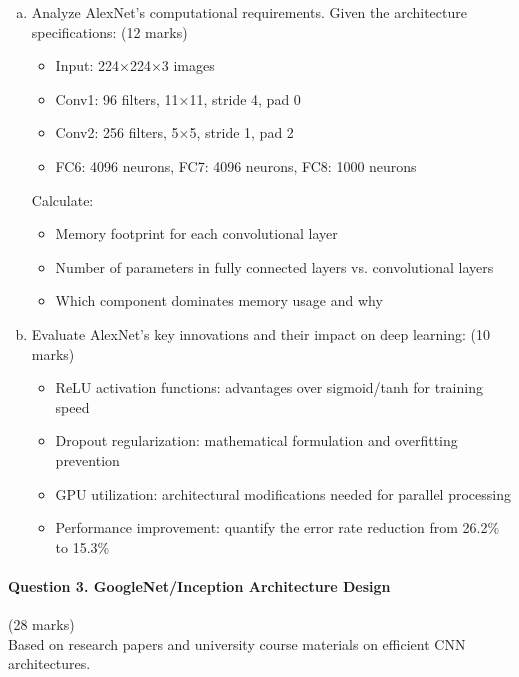 \documentclass[12pt]{article}
\newcommand{\mediumanswer}{\vspace{3cm}}
\newcommand{\journalspace}{\vspace{4.5cm}}
\begin{document}
\begin{enumerate}[(a)]
    \item Analyze AlexNet's computational requirements. Given the architecture specifications: \hfill (12 marks)
    \begin{itemize}
        \item Input: 224×224×3 images
        \item Conv1: 96 filters, 11×11, stride 4, pad 0
        \item Conv2: 256 filters, 5×5, stride 1, pad 2
        \item FC6: 4096 neurons, FC7: 4096 neurons, FC8: 1000 neurons
    \end{itemize}
    
    Calculate:
    \begin{itemize}
        \item Memory footprint for each convolutional layer
        \item Number of parameters in fully connected layers vs. convolutional layers
        \item Which component dominates memory usage and why
    \end{itemize}
    
    \journalspace
    
    \item Evaluate AlexNet's key innovations and their impact on deep learning: \hfill (10 marks)
    \begin{itemize}
        \item ReLU activation functions: advantages over sigmoid/tanh for training speed
        \item Dropout regularization: mathematical formulation and overfitting prevention
        \item GPU utilization: architectural modifications needed for parallel processing
        \item Performance improvement: quantify the error rate reduction from 26.2\% to 15.3\%
    \end{itemize}
    
    \mediumanswer
\end{enumerate}

\newpage
\paragraph{Question 3. GoogleNet/Inception Architecture Design}{\hfill (28 marks)}\\
Based on research papers and university course materials on efficient CNN architectures.
\end{document}
